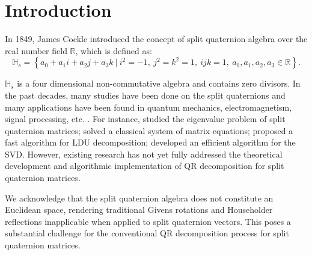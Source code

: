 \documentclass[12pt]{article}
\numberwithin{equation}{section}
\begin{document}

\section{Introduction}
In 1849, James Cockle \citep{Cockle1849} introduced the concept of split quaternion algebra over the real number field $\mathbb{R}$, which is defined as:
\begin{equation*}
    \mathbb{H}_s = \left\{ a_0 + a_1 i + a_2 j + a_3 k \ \bigg| \ i^2 = -1,\ j^2 = k^2 = 1, \ ijk = 1, \ a_0, a_1, a_2, a_3 \in \mathbb{R}\right\}. 
\end{equation*} 

 $\mathbb{H}_s$ is a four dimensional non-commutative algebra and contains zero divisors. 
  In the past decades, many studies have been done on the split quaternions \citep{AR2020,Yasemin2012,TJiang2015,Jiang2018,TJiang2018,Zhuo2020,Yang2020,mma2023,wang2024,Wang2021,Gang2024,yuan2017,Zhang2015} and  many applications have been found in quantum mechanics, electromagnetism, signal processing, etc. \citep{Gog2022, Hasebe2010, Z2022, Wang2023}. For instance, \citep{Jiang2018} studied the eigenvalue problem of split quaternion matrices; \citep{wang2024} solved a classical system of matrix equations; 
 \citep{Wang2021} proposed a fast algorithm for LDU decomposition; \citep{Gang2024} developed an efficient algorithm for the SVD. However, existing research has not yet fully addressed the theoretical development and algorithmic implementation of QR decomposition for split quaternion matrices.
 
We acknowledge that the split quaternion algebra does not constitute an Euclidean space, rendering traditional Givens rotations and Householder reflections inapplicable when applied to split quaternion vectors. This poses a substantial challenge for the conventional QR decomposition process for split quaternion matrices.
\end{document}
